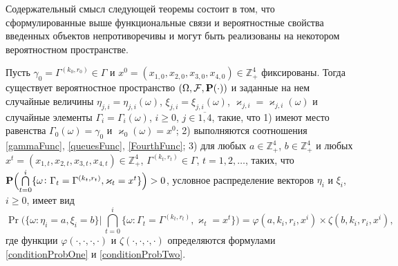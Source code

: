 \documentclass[a4paper,12pt,russian]{extarticle}
\begin{document}
Содержательный смысл следующей теоремы состоит в том, что сформулированные выше функциональные связи и вероятностные свойства введенных объектов непротиворечивы и могут быть реализованы на некотором вероятностном пространстве.
\begin{theorem}
Пусть $\gamma_0=\Gamma^{(k_0,r_0)}\in \Gamma$ и $x^0=(x_{1,0},x_{2,0}, x_{3,0},x_{4,0})\in \mathbb{Z}_+^4$ фиксированы.
Тогда существует вероятностное пространство $(\Omega, {\cal F}, \Pr(\cdot))$ и заданные на нем случайные величины $\eta_{j,i}=\eta_{j,i}(\omega)$, $\xi_{j,i}=\xi_{j,i}(\omega)$, 	 $\varkappa_{j,i}=\varkappa_{j,i}(\omega)$ и случайные элементы $\Gamma_i=\Gamma_i(\omega)$, $i\geqslant 0$, $j\in \overline{1,4}$, такие, что 1) имеют место равенства $\Gamma_0(\omega) = \gamma_0$ и $\varkappa_0(\omega)=x^0$; 2) выполняются соотношения \eqref{gammaFunc}, \eqref{queuesFunc}, \eqref{FourthFunc}; 3) для любых  $a\in \mathbb{Z}_+^4$, $b\in \mathbb{Z}_+^4$ и любых $x^t=(x_{1,t},x_{2,t},x_{3,t},x_{4,t}) \in \mathbb{Z}_+^4$, $\Gamma^{(k_t,r_t)} \in \Gamma$, $t = 1, 2, \ldots$, таких, что $\Pr\Bigl(\bigcap\limits_{t=0}^{i}\{\omega\colon \Gamma_t=\Gamma^{(k_t,r_t)}, \varkappa_t=x^t\}\Bigr)>0$, условное распределение векторов $\eta_i$ и $\xi_i$, $i \geqslant 0$,  имеет вид
\begin{equation}
\Pr \biggl(\{ \omega \colon \eta_i = a, \xi_i=b\} \bigg
|\,\bigcap_{t=0}^{i}\{\omega\colon \Gamma_t=\Gamma^{(k_t,r_t)}, \varkappa_t=x^t\}\biggr)=
\varphi(a,k_i,r_i,x^i)\times \zeta(b,k_i,r_i,x^i),
\label{ProbablititiesToProve}
\end{equation}
где функции $\varphi(\cdot, \cdot, \cdot, \cdot)$ и $\zeta(\cdot, \cdot, \cdot, \cdot)$ определяются формулами \eqref{conditionProbOne} и \eqref{conditionProbTwo}.

\label{myTheorem}
\end{theorem}
\end{document}
